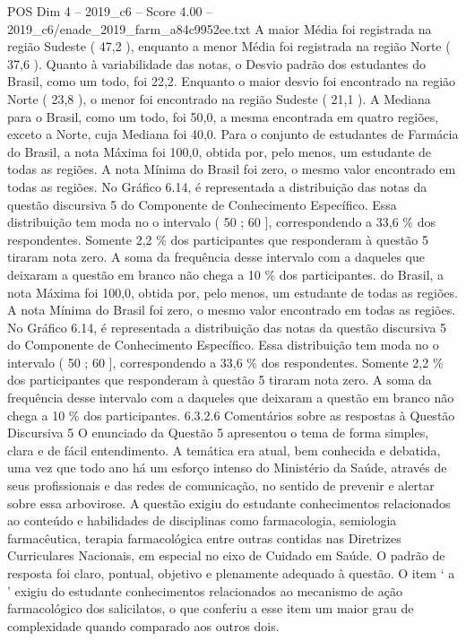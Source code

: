 \begin{textsample}{POS Dim 4 – 2019\_c6 – Score 4.00 – 2019\_c6/enade\_2019\_farm\_a84c9952ee.txt}
A maior Média foi registrada na região Sudeste ( 47,2 ), enquanto a menor Média foi registrada na região Norte ( 37,6 ).
Quanto à variabilidade das notas, o Desvio padrão dos estudantes do Brasil, como um todo, foi 22,2.
Enquanto o maior desvio foi encontrado na região Norte ( 23,8 ), o menor foi encontrado na região Sudeste ( 21,1 ).
A Mediana para o Brasil, como um todo, foi 50,0, a mesma encontrada em quatro regiões, exceto a Norte, cuja Mediana foi 40,0.
Para o conjunto de estudantes de Farmácia do Brasil, a nota Máxima foi 100,0, obtida por, pelo menos, um estudante de todas as regiões.
A nota Mínima do Brasil foi zero, o mesmo valor encontrado em todas as regiões.
No Gráfico 6.14, é representada a distribuição das notas da questão discursiva 5 do Componente de Conhecimento Específico.
Essa distribuição tem moda no o intervalo ( 50 ; 60 ], correspondendo a 33,6 \% dos respondentes.
Somente 2,2 \% dos participantes que responderam à questão 5 tiraram nota zero.
A soma da frequência desse intervalo com a daqueles que deixaram a questão em branco não chega a 10 \% dos participantes. do Brasil, a nota Máxima foi 100,0, obtida por, pelo menos, um estudante de todas as regiões.
A nota Mínima do Brasil foi zero, o mesmo valor encontrado em todas as regiões.
No Gráfico 6.14, é representada a distribuição das notas da questão discursiva 5 do Componente de Conhecimento Específico.
Essa distribuição tem moda no o intervalo ( 50 ; 60 ], correspondendo a 33,6 \% dos respondentes.
Somente 2,2 \% dos participantes que responderam à questão 5 tiraram nota zero.
A soma da frequência desse intervalo com a daqueles que deixaram a questão em branco não chega a 10 \% dos participantes. 6.3.2.6 Comentários sobre as respostas à Questão Discursiva 5 O enunciado da Questão 5 apresentou o tema de forma simples, clara e de fácil entendimento.
A temática era atual, bem conhecida e debatida, uma vez que todo ano há um esforço intenso do Ministério da Saúde, através de seus profissionais e das redes de comunicação, no sentido de prevenir e alertar sobre essa arbovirose.
A questão exigiu do estudante conhecimentos relacionados ao conteúdo e habilidades de disciplinas como farmacologia, semiologia farmacêutica, terapia farmacológica entre outras contidas nas Diretrizes Curriculares Nacionais, em especial no eixo de Cuidado em Saúde.
O padrão de resposta foi claro, pontual, objetivo e plenamente adequado à questão.
O item ‘ a ’ exigiu do estudante conhecimentos relacionados ao mecanismo de ação farmacológico dos salicilatos, o que conferiu a esse item um maior grau de complexidade quando comparado aos outros dois.

\end{textsample}
